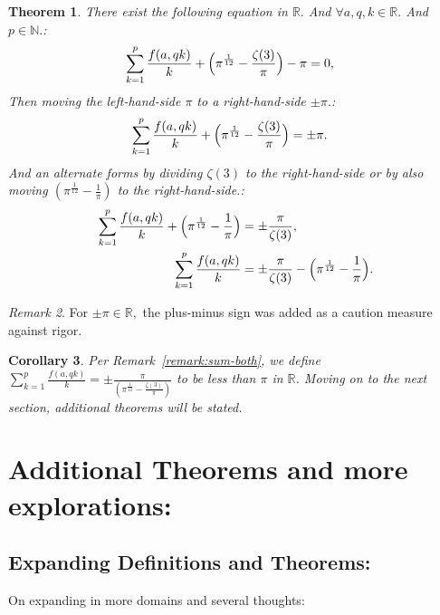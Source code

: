 \documentclass[10pt]{article}
\theoremstyle{plain}
\newtheorem{theorem}{Theorem}[section]
\newtheorem{corollary}[theorem]{Corollary}
\theoremstyle{definition}
\theoremstyle{remark}
\newtheorem{remark}[theorem]{Remark}
\begin{document}
\begin{theorem}
There exist the following equation in $\mathbb{R}.$ And $\forall a, q, k \in \mathbb{R}.$ And $p \in \mathbb{N}.$:
\begin{align*}
	\sum_{k=1}^{p} \frac{f(a, qk)}{k} + \Bigl( \pi^{\frac{1}{12}} - \frac{\zeta(3)}{\pi} \Bigr)  - \pi &= 0,
\end{align*}
Then moving the left-hand-side $\pi$ to a right-hand-side $\pm \pi$.:
\begin{align*}
	\sum_{k=1}^{p} \frac{f(a, qk)}{k} + \Bigl( \pi^{\frac{1}{12}} - \frac{\zeta(3)}{\pi} \Bigr) &= \pm \pi.
\end{align*}
And an alternate forms by dividing $\zeta(3)$ to the right-hand-side or by also moving $(\pi^{\frac{1}{12}} - \frac{1}{\pi})$ to the right-hand-side.:
\begin{align*}
	\sum_{k=1}^{p} \frac{f(a, qk)}{k} + \Bigl( \pi^{\frac{1}{12}} - \frac{1}{\pi} \Bigr) &= \pm \frac{\pi}{\zeta(3)},\\
	\sum_{k=1}^{p} \frac{f(a, qk)}{k} &= \pm \frac{\pi}{\zeta(3)} - \Bigl( \pi^{\frac{1}{12}} - \frac{1}{\pi} \Bigr).
\end{align*}
\end{theorem}
\begin{remark}
For $\pm \pi \in \mathbb{R},$ the plus-minus sign was added as a caution measure against rigor.
\end{remark}
\begin{corollary}
Per Remark~\ref{remark:sum-both}, we define $\sum_{k=1}^{p} \frac{f(a, qk)}{k} = \pm \frac{\pi}{(\pi^{\frac{1}{12}} - \frac{\zeta(3)}{\pi})}$ to be less than $\pi$ in $\mathbb{R}$.  Moving on to the next section, additional theorems will be stated.
\end{corollary}
\section{Additional Theorems and more explorations:}

\subsection{Expanding Definitions and Theorems:}
On expanding in more domains and several thoughts:
\end{document}
